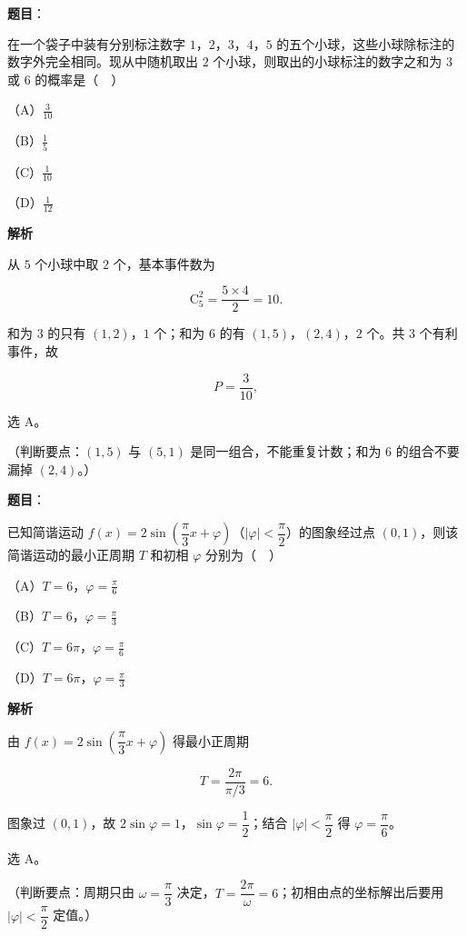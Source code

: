 \begin{answer}

\textbf{题目}：

在一个袋子中装有分别标注数字 $1$，$2$，$3$，$4$，$5$ 的五个小球，这些小球除标注的数字外完全相同。现从中随机取出 $2$ 个小球，则取出的小球标注的数字之和为 $3$ 或 $6$ 的概率是（　）

（A）$\frac{3}{10}$

（B）$\frac15$

（C）$\frac1{10}$

（D）$\frac1{12}$

\textbf{解析}

从 $5$ 个小球中取 $2$ 个，基本事件数为

\nopagebreak[4]
\[\mathrm C_5^2=\frac{5\times4}{2}=10.\]

和为 $3$ 的只有 $(1,2)$，$1$ 个；和为 $6$ 的有 $(1,5)$，$(2,4)$，$2$ 个。共 $3$ 个有利事件，故

\nopagebreak[4]
\[P=\frac{3}{10},\]

选 A。

（判断要点：$(1,5)$ 与 $(5,1)$ 是同一组合，不能重复计数；和为 $6$ 的组合不要漏掉 $(2,4)$。）


\end{answer}
\begin{answer}

\textbf{题目}：

已知简谐运动 $f(x)=2\sin\left(\dfrac{\pi}{3}x+\varphi\right)$（$|\varphi|<\dfrac{\pi}{2}$）的图象经过点 $(0,1)$，则该简谐运动的最小正周期 $T$ 和初相 $\varphi$ 分别为（　）

（A）$T=6$，$\varphi=\frac{\pi}{6}$

（B）$T=6$，$\varphi=\frac{\pi}{3}$

（C）$T=6\pi$，$\varphi=\frac{\pi}{6}$

（D）$T=6\pi$，$\varphi=\frac{\pi}{3}$

\textbf{解析}

由 $f(x)=2\sin\left(\dfrac{\pi}{3}x+\varphi\right)$ 得最小正周期

\nopagebreak[4]
\[T=\frac{2\pi}{\pi/3}=6.\]

图象过 $(0,1)$，故 $2\sin\varphi=1$，$\sin\varphi=\dfrac12$；结合 $|\varphi|<\dfrac{\pi}{2}$ 得 $\varphi=\dfrac{\pi}{6}$。

选 A。

（判断要点：周期只由 $\omega=\dfrac{\pi}{3}$ 决定，$T=\dfrac{2\pi}{\omega}=6$；初相由点的坐标解出后要用 $|\varphi|<\dfrac{\pi}{2}$ 定值。）


\end{answer}
